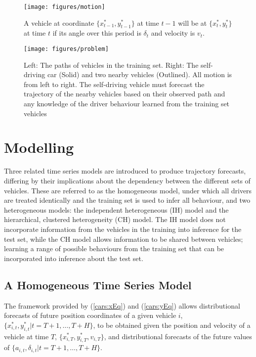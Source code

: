 \documentclass[
12pt, %
onehalfspacing, %
nohyperref, %
headsepline, %
chapterinoneline, %
]{MastersDoctoralThesis} %
\begin{document}
\begin{figure}[htbp]
\centering
\texttt{[image: figures/motion]}
\caption{A vehicle at coordinate $\{x^*_{t-1}, y^*_{t-1}\}$ at time $t-1$ will be at $\{x^*_t, y^*_t\}$ at time $t$ if its angle over this period is $\delta_t$ and velocity is $v_t$.}
\label{fig:carsmotion}
\end{figure}

\begin{figure}[htbp]
\centering
\texttt{[image: figures/problem]}
\caption{Left: The paths of vehicles in the training set. Right: The self-driving car (Solid) and two nearby vehicles (Outlined). All motion is from left to right. The self-driving vehicle must forecast the trajectory of the nearby vehicles based on their observed path and any knowledge of the driver behaviour learned from the training set vehicles}
\label{fig:carsproblem}
\end{figure}

\section{Modelling}
\label{sec:carsmodels}

Three related time series models are introduced to produce trajectory forecasts, differing by their implications about the dependency between the different sets of vehicles. These are referred to as the homogeneous model, under which all drivers are treated identically and the training set is used to infer all behaviour, and two heterogeneous models: the independent heterogeneous (IH) model and the hierarchical, clustered heterogeneity (CH) model. The IH model does not incorporate information from the vehicles in the training into inference for the test set, while the CH model allows information to be shared between vehicles; learning a range of possible behaviours from the training set that can be incorporated into inference about the test set. 
\\

\subsection{A Homogeneous Time Series Model}
\label{subsec:carshomogeneous}

The framework provided by (\ref{cars:xEq}) and (\ref{cars:yEq}) allows distributional forecasts of future position coordinates of a given vehicle $i$, $\{x^*_{i, t}, y^*_{i, t} | t = T + 1, \ldots, T+H\}$, to be obtained given the position and velocity of a vehicle at time $T$, $\{x^*_{i, T}, y^*_{i, T}, v_{i, T}\}$, and distributional forecasts of the future values of $\{a_{i, t}, \delta_{i, t} | t = T + 1, \ldots, T+H\}$.  
\\
\end{document}
